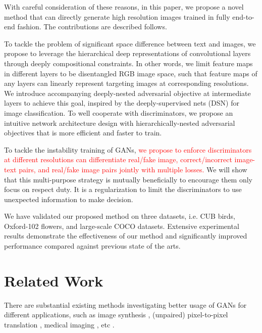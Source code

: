 \documentclass[10pt,twocolumn,letterpaper]{article}
\begin{document}
With careful consideration of these reasons, in this paper, we propose a novel method that can directly generate high resolution images trained in fully end-to-end fashion. The contributions are described follows.

To tackle the problem of significant space difference between text and images, we propose to leverage the hierarchical deep representations of convolutional layers through deeply compositional constraints. In other words, we limit feature maps in different layers to be disentangled RGB image space, such that feature maps of any layers can linearly represent targeting images at corresponding resolutions. We introduce accompanying deeply-nested adversarial objective at intermediate layers to achieve this goal, inspired by the deeply-supervised nets (DSN) \cite{lee2015deeply} for image classification.
To well cooperate with discriminators, we propose an intuitive network architecture design with hierarchically-nested adversarial objectives that is more efficient and faster to train.

To tackle the instability training of GANs, \textcolor{red}{we propose to enforce discriminators at different resolutions can differentiate real/fake image, correct/incorrect image-text pairs, and real/fake image pairs jointly with multiple losses.} We will show that this multi-purpose strategy is mutually beneficially to encourage them only focus on respect duty. It is a regularization to limit the discriminators to use unexpected information to make decision. 

We have validated our proposed method on three datasets, i.e. CUB birds, Oxford-102 flowers, and large-scale COCO datasets. Extensive experimental results demonstrate the effectiveness of our method and significantly improved performance compared against previous state of the arts.


\section{Related Work}
There are substantial existing methods investigating better usage of GANs \cite{goodfellow2014generative,radford2015unsupervised} for different applications, such as image synthesis \cite{shrivastava2016learning}, (unpaired) pixel-to-pixel translation \cite{isola2016image,zhu2017unpaired},  medical imaging \cite{costa2017towards}, etc \cite{}.
\end{document}
